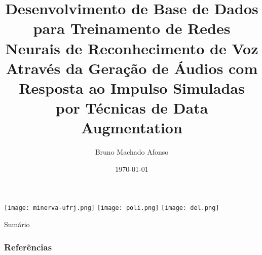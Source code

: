 \documentclass{libs/XJTLU_format}
\title[Defesa de Projeto de Graduação]{\normalsize\textbf{Desenvolvimento de Base de Dados para Treinamento de Redes Neurais de Reconhecimento de Voz
Através da Geração de Áudios com Resposta ao Impulso Simuladas por Técnicas de Data Augmentation}}
\author{Bruno Machado Afonso}
\institute[- Escola Politécnica]{
    \email{bruno.ma@poli.ufrj.br}
    \newline
    \department{\scriptsize Departamento de Engenharia Eletrônica e de Computação - Escola Politécnica}
    \newline
    \university{\scriptsize Universidade Federal do Rio de Janeiro}
}
\date{\today}
\begin{document}


\begin{frame}{}
    \texttt{[image: minerva-ufrj.png]} \hspace{3cm} \vspace{-0.2cm}
    \texttt{[image: poli.png]} \hspace{2cm} \vspace{-0.2cm}
    \texttt{[image: del.png]} \hspace{-0.1cm} \vspace{-0.1cm}
    \maketitle
\end{frame} 

\begin{frame}{Sumário}
        \tableofcontents
\end{frame}









\begin{frame}%
    \frametitle{Referências}
    \printbibliography
\end{frame}
\end{document}
